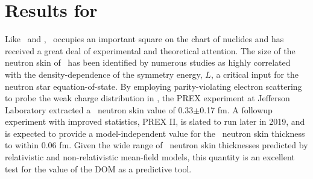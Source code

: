 \section{Results for \pbEight}
Like \caForty\ and \oSix, \pbEight\ occupies an important square on the chart of nuclides and has
received a great deal of experimental and theoretical attention. 
The size of the neutron skin of \pbEight\ has been identified by numerous studies as highly
correlated with the density-dependence of the symmetry energy, $L$, a critical input for the neutron
star equation-of-state. By employing parity-violating electron scattering to probe the
weak charge distribution in \pbEight, the PREX experiment at Jefferson Laboratory extracted a
\pbEight\ neutron skin value of 0.33$\pm$0.17 fm. A followup experiment with improved statistics, PREX II,
is slated to run later in 2019, and is expected to provide a model-independent
value for the \pbEight\ neutron skin thickness to
within 0.06 fm. Given the wide range of \pbEight\ neutron skin thicknesses
predicted by relativistic
and non-relativistic mean-field models, this quantity is an excellent
test for the value of the DOM as a predictive tool.

